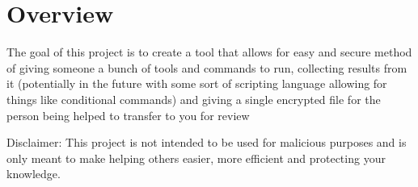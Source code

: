 \chapter{Overview}
The goal of this project is to create a tool that allows for easy and secure method of giving someone a bunch of tools and commands to run, collecting results from it (potentially in the future with some sort of scripting language allowing for things like conditional commands) and giving a single encrypted file for the person being helped to transfer to you for review

Disclaimer:
This project is not intended to be used for malicious purposes and is only meant to make helping others easier, more efficient and protecting your knowledge.